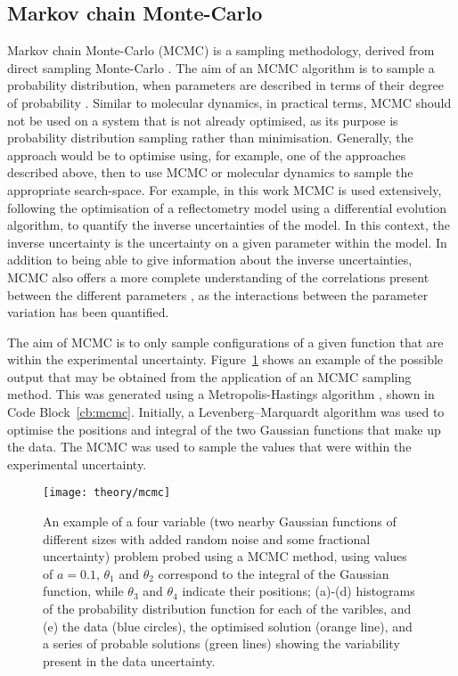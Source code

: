 \subsection{Markov chain Monte-Carlo}
\label{sec:mcmc}
Markov chain Monte-Carlo (MCMC) is a sampling methodology, derived from direct sampling Monte-Carlo \cite{krauth_statistical_2006}.
The aim of an MCMC algorithm is to sample a probability distribution, when parameters are described in terms of their degree of probability \cite{sivia_data_2006}.
Similar to molecular dynamics, in practical terms, MCMC should not be used on a system that is not already optimised, as its purpose is probability distribution sampling rather than minimisation.
Generally, the approach would be to optimise using, for example, one of the approaches described above, then to use MCMC or molecular dynamics to sample the appropriate search-space.
For example, in this work MCMC is used extensively, following the optimisation of a reflectometry model using a differential evolution algorithm, to quantify the inverse uncertainties of the model.
In this context, the inverse uncertainty is the uncertainty on a given parameter within the model.
In addition to being able to give information about the inverse uncertainties, MCMC also offers a more complete understanding of the correlations present between the different parameters \cite{gilks_markov_1995}, as the interactions between the parameter variation has been quantified.

The aim of MCMC is to only sample configurations of a given function that are within the experimental uncertainty.
Figure~\ref{fig:mcmc} shows an example of the possible output that may be obtained from the application of an MCMC sampling method.
This was generated using a Metropolis-Hastings algorithm \cite{metropolis_equation_1953,hastings_monte_1970}, shown in Code Block~\ref{cb:mcmc}.
Initially, a Levenberg–Marquardt algorithm \cite{levenberg_method_1944,marquardt_algorithm_1963} was used to optimise the positions and integral of the two Gaussian functions that make up the data.
The MCMC was used to sample the values that were within the experimental uncertainty.
%
\begin{figure}
    \centering
    \texttt{[image: theory/mcmc]}
    \caption{An example of a four variable (two nearby Gaussian functions of different sizes with added random noise and some fractional uncertainty) problem probed using a MCMC method, using values of $a=0.1$, $\theta_1$ and $\theta_2$ correspond to the integral of the Gaussian function, while $\theta_3$ and $\theta_4$ indicate their positions; (a)-(d) histograms of the probability distribution function for each of the varibles, and (e) the data (blue circles), the optimised solution (orange line), and a series of probable solutions (green lines) showing the variability present in the data uncertainty.}
    \label{fig:mcmc}
\end{figure}
%
\begin{figure}
    \centering
        
\end{figure}
%

